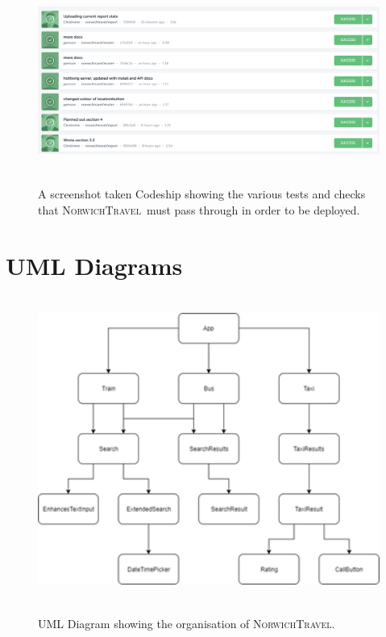\documentclass[cmpstyle]{ueacmpstyle}
\newcommand{\nt}{\textsc{NorwichTravel}}
\begin{document}
		\begin{figure}[h]
			\centering
			\includegraphics[height=6cm]{images/codeship.png}\\
			\caption{A screenshot taken Codeship showing the various tests and checks that \nt \ must pass through in order to be deployed.}\label{fig:codeship}
		\end{figure}
	\clearpage
	\section{UML Diagrams}
		\begin{figure}[h]
			\centering
			\includegraphics[height=10cm]{images/object-orientated.png}\\
			\caption{UML Diagram showing the organisation of \nt.}\label{fig:oo}
		\end{figure}
\end{document}
